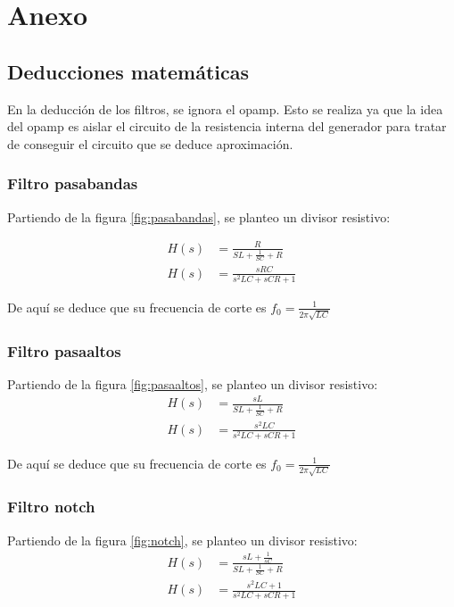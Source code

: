 \section{Anexo}

\subsection{Deducciones matemáticas}
\label{subsec:Deduccionesmat}
En la deducción de los filtros, se ignora el opamp. Esto se realiza ya que la idea del opamp es aislar el circuito de la resistencia interna del generador para tratar de conseguir el circuito que se deduce aproximación. \\
\subsubsection{Filtro pasabandas}
\label{subsec:eqpasabandas}
Partiendo de la figura \ref{fig:pasabandas}, se planteo un divisor resistivo:

\begin{align*}
   H(s) &= \frac{R}{SL+\frac{1}{SC}+R}\\
   H(s) &= \frac{sRC}{s^2LC+ sCR +1}
\end{align*}

De aquí se deduce que su frecuencia de corte es $f_0 = \frac{1}{2\pi \sqrt{LC}}$

\subsubsection{Filtro pasaaltos}
\label{subsec:eqpasaaltos}
Partiendo de la figura \ref{fig:pasaaltos}, se planteo un divisor resistivo:
\begin{align*}
   H(s) &= \frac{sL}{SL+\frac{1}{SC}+R}\\
   H(s) &= \frac{s^2LC}{s^2LC+ sCR +1}
\end{align*}

De aquí se deduce que su frecuencia de corte es $f_0 = \frac{1}{2\pi \sqrt{LC}}$

\subsubsection{Filtro notch}
\label{subsec:eqpasabandas}
Partiendo de la figura \ref{fig:notch}, se planteo un divisor resistivo:
\begin{align*}
   H(s) &= \frac{sL+\frac{1}{sC}}{SL+\frac{1}{SC}+R}\\
   H(s) &= \frac{s^2LC+1}{s^2LC+ sCR +1}
\end{align*}

